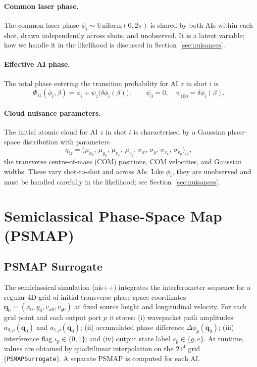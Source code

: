 \documentclass[11pt,a4paper]{article}
\newcommand{\q}{\mathbf{q}}
\begin{document}
\paragraph{Common laser phase.}
The common laser phase $\phi_i \sim \mathrm{Uniform}(0, 2\pi)$ is shared by
both AIs within each shot, drawn independently across shots, and unobserved.
It is a latent variable; how we handle it in the likelihood is discussed in
Section~\ref{sec:nuisances}.

\paragraph{Effective AI phase.}
The total phase entering the transition probability for AI $z$ in shot $i$ is
\begin{equation}
  \Phi_{iz}(\phi_i,\beta)
  = \phi_i + \psi_z\!\bigl(\delta\phi_i(\beta)\bigr),
  \qquad
  \psi_0 = 0,\quad \psi_{100} = \delta\phi_i(\beta).
  \label{eq:eff_phase}
\end{equation}

\paragraph{Cloud nuisance parameters.}
The initial atomic cloud for AI $z$ in shot $i$ is characterised by a
Gaussian phase-space distribution with parameters
\begin{equation}
  \eta_{iz}
  =
  \bigl(
    \mu_{x_0},\,\mu_{y_0},\,\mu_{v_x},\,\mu_{v_y},\,
    \sigma_x,\,\sigma_y,\,\sigma_{v_x},\,\sigma_{v_y}
  \bigr)_{iz},
\end{equation}
the transverse centre-of-mass (COM) positions, COM velocities, and Gaussian
widths.  These vary shot-to-shot and across AIs.  Like $\phi_i$, they are
unobserved and must be handled carefully in the likelihood; see
Section~\ref{sec:nuisances}.

\section{Semiclassical Phase-Space Map (PSMAP)}

\subsection{PSMAP Surrogate}

The semiclassical simulation (ais++) integrates the interferometer sequence for a
regular 4D grid of initial transverse phase-space coordinates
$\q_0 = (x_0, y_0, v_{x0}, v_{y0})$ at fixed source height and longitudinal
velocity.  For each grid point and each output port $p$ it stores:
(i) wavepacket path amplitudes $a_{0,p}(\q_0)$ and $a_{1,p}(\q_0)$;
(ii) accumulated phase difference $\Delta\phi_p(\q_0)$;
(iii) interference flag $\iota_p \in \{0,1\}$; and
(iv) output state label $s_p \in \{g,e\}$.
At runtime, values are obtained by quadrilinear interpolation on the
$21^4$ grid (\texttt{PSMAPSurrogate}).
A separate PSMAP is computed for each AI.
\end{document}
